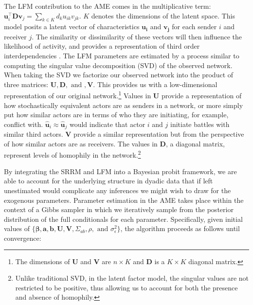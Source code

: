 The LFM contribution to the AME comes in the multiplicative term: $\textbf{u}_{i}^{\top} \textbf{D} \textbf{v}_{j}=\sum_{k \in K} d_{k} u_{ik} v_{jk}$. $K$ denotes the dimensions of the latent space. This model posits a latent vector of characteristics $\mathbf{u_{i}}$ and $\mathbf{v_{j}}$ for each sender $i$ and receiver $j$. The similarity or dissimilarity of these vectors will then influence the likelihood of activity, and provides a representation of third order interdependencies \citep{minhas:etal:2016:arxiv}. The LFM parameters are estimated by a process similar to computing the singular value decomposition (SVD) of the observed network. When taking the SVD we factorize our observed network into the product of three matrices: $\textbf{U}, \textbf{D}, \text{ and }, \textbf{V}$. This provides us with a low-dimensional representation of our original network.\footnote{The dimensions of $\textbf{U}$ and $\textbf{V}$ are $n \times K$ and $\textbf{D}$ is a $K \times K$ diagonal matrix.} Values in $\textbf{U}$ provide a representation of how stochastically equivalent actors are as senders in a network, or more simply put how similar actors are in terms of who they are initiating, for example, conflict with. $\hat{\textbf{u}}_{i} \approx \hat{\textbf{u}}_{j}$ would indicate that actor $i$ and $j$ initiate battles with similar third actors. $\textbf{V}$ provide a similar representation but from the perspective of how similar actors are as receivers. The values in $\textbf{D}$, a diagonal matrix, represent levels of homophily in the network.\footnote{Unlike traditional SVD, in the latent factor model, the singular values are not restricted to be positive, thus allowing us to account for both the presence and absence of homophily.} 

By integrating the SRRM and LFM into a Bayesian probit framework, we are able to account for the underlying structure in dyadic data that if left unestimated would complicate any inferences we might wish to draw for the exogenous parameters. Parameter estimation in the AME takes place within the context of a Gibbs sampler in which we iteratively sample from the posterior distribution of the full conditionals for each parameter. Specifically, given initial values of $\{\bm\beta, \textbf{a}, \textbf{b}, \textbf{U}, \textbf{V}, \Sigma_{ab}, \rho, \text{ and } \sigma_{\epsilon}^{2}\}$, the algorithm proceeds as follows until convergence:

